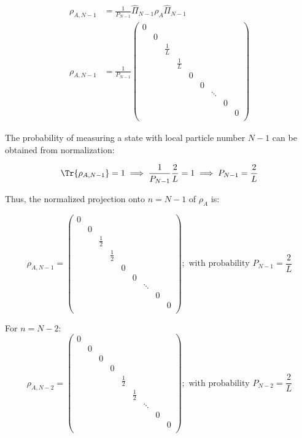 \begin{equation}
\begin{aligned}
\rho_{A,N-1} &= \frac{1}{P_{N-1}} \hat{\Pi}_{N-1} \rho_{A} \hat{\Pi}_{N-1} \\
\rho_{A,N-1} &= \frac{1}{P_{N-1}} \begin{pmatrix} 
0 \\
& 0 \\
& & \frac{1}{L} \\
& & & \frac{1}{L} \\
& & & &  0 \\
& & & & & 0 \\
& & & & &  & \ddots \\
& & & & & & &  0 \\
& & & & & & & &  0 \\
\end{pmatrix} 
\end{aligned}
\end{equation}

The probability of measuring a state with local particle number $N-1$ can be obtained from normalization:

\begin{equation}
\Tr{\rho_{A,N-1}} = 1 \implies \frac{1}{P_{N-1}}\frac{2}{L} = 1 \implies P_{N-1} = \frac{2}{L}
\end{equation}

Thus, the normalized projection onto $n=N-1$ of $\rho_{A}$ is:

\begin{equation}
\rho_{A,N-1} = \begin{pmatrix} 
0 \\
& 0 \\
& & \frac{1}{2} \\
& & & \frac{1}{2} \\
& & & &  0 \\
& & & & & 0 \\
& & & & &  & \ddots \\
& & & & & & &  0 \\
& & & & & & & &  0 \\
\end{pmatrix} ; \text{ with probability } P_{N-1} = \frac{2}{L}
\end{equation}

For $n = N-2$:
\begin{equation}
 \rho_{A,N-2} = \begin{pmatrix} 
0 \\
& 0 \\
& & 0  \\
& & & 0 \\
& & & &  \frac{1}{2} \\
& & & & & \frac{1}{2} \\
& & & & &  & \ddots \\
& & & & & & &  0 \\
& & & & & & & &  0 \\
\end{pmatrix} ; \text{ with probability } P_{N-2} = \frac{2}{L}
\end{equation}

